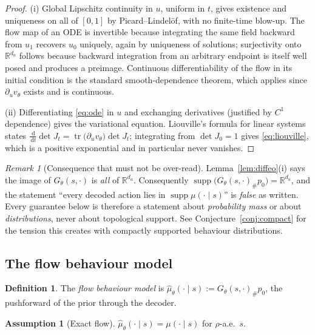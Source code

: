 \documentclass[11pt]{article}
\theoremstyle{plain}
\theoremstyle{definition}
\newtheorem{definition}[lemma]{Definition}
\newtheorem{assumption}{Assumption}
\theoremstyle{remark}
\newtheorem{remark}[lemma]{Remark}
\newcommand{\R}{\mathbb R}
\newcommand{\1}{\mathbf 1}
\newcommand{\supp}{\operatorname{supp}}
\newcommand{\tr}{\operatorname{tr}}
\newcommand{\dd}{\,\mathrm d}
\newcommand{\Gth}{G_\theta}
\newcommand{\muhat}{\hat\mu_\theta}
\begin{document}
\begin{proof}
(i) Global Lipschitz continuity in $u$, uniform in $t$, gives existence and uniqueness on
all of $[0,1]$ by Picard--Lindel\"of, with no finite-time blow-up. The flow map of an ODE
is invertible because integrating the same field backward from $u_1$ recovers $u_0$
uniquely, again by uniqueness of solutions; surjectivity onto $\R^{d_a}$ follows because
backward integration from an arbitrary endpoint is itself well posed and produces a
preimage. Continuous differentiability of the flow in its initial condition is the
standard smooth-dependence theorem, which applies since $\partial_u v_\theta$ exists and
is continuous.

(ii) Differentiating \eqref{eq:ode} in $u$ and exchanging derivatives (justified by
$C^1$ dependence) gives the variational equation. Liouville's formula for linear systems
states $\frac{\dd}{\dd t}\det J_t=\tr\big(\partial_u v_\theta\big)\det J_t$; integrating
from $\det J_0=1$ gives \eqref{eq:liouville}, which is a positive exponential and in
particular never vanishes.
\end{proof}

\begin{remark}[Consequence that must not be over-read]
\label{rem:full-support}
Lemma~\ref{lem:diffeo}(i) says the image of $\Gth(s,\cdot)$ is \emph{all} of $\R^{d_a}$.
Consequently $\supp\big(\Gth(s,\cdot)_\#p_0\big)=\R^{d_a}$, and the statement ``every
decoded action lies in $\supp\mu(\cdot\mid s)$'' is \emph{false} as written. Every
guarantee below is therefore a statement about \emph{probability mass} or about
\emph{distributions}, never about topological support. See
Conjecture~\ref{conj:compact} for the tension this creates with compactly supported
behaviour distributions.
\end{remark}

\subsection{The flow behaviour model}

\begin{definition}
\label{def:muhat}
The \emph{flow behaviour model} is $\muhat(\cdot\mid s):=\Gth(s,\cdot)_\#p_0$, the
pushforward of the prior through the decoder.
\end{definition}

\begin{assumption}[Exact flow]
\label{ass:exact}
$\muhat(\cdot\mid s)=\mu(\cdot\mid s)$ for $\rho$-a.e.\ $s$.
\end{assumption}
\end{document}
